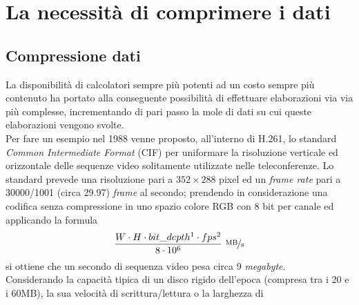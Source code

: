 
\chapter{La necessità di comprimere i dati} %

\label{Chapter3}



\section{Compressione dati}
La disponibilità di calcolatori sempre più potenti ad un costo sempre più
contenuto ha portato alla conseguente possibilità di effettuare elaborazioni
via via più complesse, incrementando di pari passo la mole di dati su cui
queste elaborazioni vengono svolte. \\
Per fare un esempio nel 1988 venne proposto, all'interno di H.261, lo standard
\emph{Common Intermediate Format} (CIF) per uniformare la risoluzione verticale
ed orizzontale delle sequenze video solitamente utilizzate nelle teleconferenze.
Lo standard prevede una risoluzione pari a $352{\times}288$ pixel ed un
\emph{frame rate} pari a 30000/1001 (circa 29.97) \emph{frame} al secondo;
prendendo in considerazione una codifica senza compressione in uno spazio
colore RGB con 8 bit per canale ed applicando la formula
\begin{align*}
  \frac{W \cdot H \cdot bit\_depth\footnotemark[1] \cdot fps\footnotemark[2]} 
  {8\cdot10^6} \ \nicefrac{\text{MB}}{\text{s}}
\end{align*}%
si ottiene che un secondo di sequenza video pesa circa 9 \emph{megabyte}. \\
Considerando la capacità tipica di un disco rigido dell'epoca (compresa
tra i 20 e i 60MB), la sua velocità di scrittura/lettura o la larghezza di 
